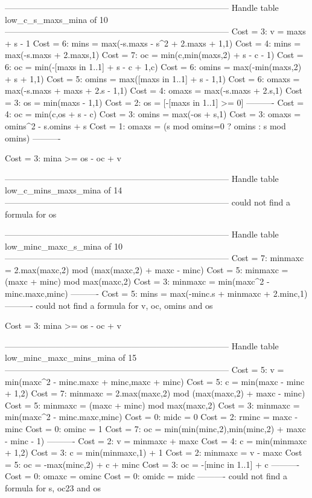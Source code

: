 --------------------------------------------------------------------------------
Handle table low_c_s_maxs_mina of 10
--------------------------------------------------------------------------------
Cost =  3:  v     = maxs + s - 1
Cost =  6:  mins  = max(-s.maxs - s^2 + 2.maxs + 1,1)
Cost =  4:  mins  = max(-s.maxs + 2.maxs,1)
Cost =  7:  oc    = min(c,min(maxs,2) + s - c - 1)
Cost =  6:  oc    = min(-[maxs in 1..1] + s - c + 1,c)
Cost =  6:  omins = max(-min(maxs,2) + s + 1,1)
Cost =  5:  omins = max([maxs in 1..1] + s - 1,1)
Cost =  6:  omaxs = max(-s.maxs + maxs + 2.s - 1,1)
Cost =  4:  omaxs = max(-s.maxs + 2.s,1)
Cost =  3:  os    = min(maxs - 1,1)
Cost =  2:  os    = [-[maxs in 1..1] >= 0]
----------
Cost =  4:  oc    = min(c,os + s - c)
Cost =  3:  omins = max(-os + s,1)
Cost =  3:  omaxs = omins^2 - s.omins + s
Cost =  1:  omaxs = (s mod omins=0 ? omins : s mod omins)
----------

Cost =  3:  mina >= os - oc + v

--------------------------------------------------------------------------------
Handle table low_c_mins_maxs_mina of 14
--------------------------------------------------------------------------------
could not find a formula for os


--------------------------------------------------------------------------------
Handle table low_minc_maxc_s_mina of 10
--------------------------------------------------------------------------------
Cost =  7:  minmaxc = 2.max(maxc,2) mod (max(maxc,2) + maxc - minc)
Cost =  5:  minmaxc = (maxc + minc) mod max(maxc,2)
Cost =  3:  minmaxc = min(maxc^2 - minc.maxc,minc)
----------
Cost =  5:  mins    = max(-minc.s + minmaxc + 2.minc,1)
----------
could not find a formula for v, oc, omins and os

Cost =  3:  mina >= os - oc + v

--------------------------------------------------------------------------------
Handle table low_minc_maxc_mins_mina of 15
--------------------------------------------------------------------------------
Cost =  5:  v       = min(maxc^2 - minc.maxc + minc,maxc + minc)
Cost =  5:  c       = min(maxc - minc + 1,2)
Cost =  7:  minmaxc = 2.max(maxc,2) mod (max(maxc,2) + maxc - minc)
Cost =  5:  minmaxc = (maxc + minc) mod max(maxc,2)
Cost =  3:  minmaxc = min(maxc^2 - minc.maxc,minc)
Cost =  0:  midc    = 0
Cost =  2:  rminc   = maxc - minc
Cost =  0:  ominc   = 1
Cost =  7:  oc      = min(min(minc,2),min(minc,2) + maxc - minc - 1)
----------
Cost =  2:  v       = minmaxc + maxc
Cost =  4:  c       = min(minmaxc + 1,2)
Cost =  3:  c       = min(minmaxc,1) + 1
Cost =  2:  minmaxc = v - maxc
Cost =  5:  oc      = -max(minc,2) + c + minc
Cost =  3:  oc      = -[minc in 1..1] + c
----------
Cost =  0:  omaxc   = ominc
Cost =  0:  omidc   = midc
----------
could not find a formula for s, oc23 and os

